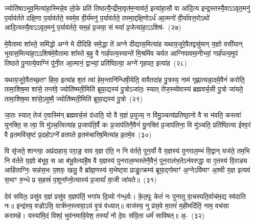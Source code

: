ज्योति॑षा\-ऽभूव॒मित्या॑हा॒स्मिन्ने॒व लो॒के प्रति॑ तिष्ठत्यै॒न्द्रीमा॒\-वृत॑म॒न्वाव॑र्त॒ इत्या॑हा॒सौ वा आ॑दि॒त्य इन्द्र॒स्तस्यै॒वा\-ऽऽ\-\-वृत॒मनु॑ प॒र्याव॑र्तते दक्षि॒णा प॒र्याव॑र्तते॒ स्वमे॒व वी॒र्य॑मनु॑ प॒र्याव॑र्तते॒ तस्मा॒द्दक्षि॒णो\-ऽर्ध॑ आ॒त्मनो॑ वी॒र्या॑वत्त॒रो\-ऽथो॑ आदि॒त्यस्यै॒वा\-ऽऽ\-वृत॒मनु॑ प॒र्याव॑र्तते॒ सम॒हं प्र॒जया॒ सं मया᳚ प्र॒जेत्या॑हा॒\-ऽऽ\-शिष॑-~(२७)

मे॒वैतामा शा᳚स्ते॒ समि॑द्धो अग्ने मे दीदिहि समे॒द्धा ते॑ अग्ने दीद्यास॒मित्या॑ह यथाय॒जुरे॒वैतद्वसु॑मान् य॒ज्ञो वसी॑यान् भूयास॒मित्या॑हा॒\-ऽऽ\-शिष॑मे॒वैतामा शा᳚स्ते ब॒हु वै गार्\mbox{}ह॑पत्य॒स्यान्ते॑ मि॒श्रमि॑व चर्यत आग्निपावमा॒नीभ्यां॒ गार्\mbox{}ह॑पत्य॒मुप॑ तिष्ठते पु॒नात्ये॒वाग्निं पु॑नी॒त आ॒त्मानं॒ द्वाभ्यां॒ प्रति॑ष्ठित्या॒ अग्ने॑ गृहपत॒ इत्या॑ह~(२८)

यथाय॒जुरे॒वैतच्छ॒तꣳ हिमा॒ इत्या॑ह श॒तं त्वा॑ हेम॒न्तानि॑न्धिषी॒येति॒ वावैतदा॑ह पु॒त्रस्य॒ नाम॑ गृह्णात्यन्ना॒दमे॒वैनं॑ करोति॒ तामा॒शिष॒मा शा॑से॒ तन्त॑वे॒ ज्योति॑ष्मती॒मिति॑ ब्रूया॒द्यस्य॑ पु॒त्रो\-ऽजा॑तः॒ स्यात् ते॑ज॒स्व्ये॑वास्य॑ ब्रह्मवर्च॒सी पु॒त्रो जा॑यते॒ तामा॒शिष॒मा शा॑से॒\-ऽमुष्मै॒ ज्योति॑ष्मती॒मिति॑ ब्रूया॒द्यस्य॑ पु॒त्रो~(२९)

जा॒तः स्यात् तेज॑ ए॒वास्मि॑न् ब्रह्मवर्च॒सं द॑धाति॒ यो वै य॒ज्ञं प्र॒युज्य॒ न वि॑मु॒ञ्चत्य॑प्रतिष्ठा॒नो वै स भ॑वति॒ कस्त्वा॑ युनक्ति॒ स त्वा॒ वि मु॑ञ्च॒त्वित्या॑ह प्र॒जा\-प॑ति॒र्वै कः प्र॒जा\-प॑तिनै॒वैनं॑ यु॒नक्ति॑ प्र॒जा\-प॑तिना॒ वि मु॑ञ्चति॒ प्रति॑ष्ठित्या ईश्व॒रं वै व्र॒तमवि॑सृष्टं प्र॒दहो\-ऽग्ने᳚ व्रतपते व्र॒तम॑चारिष॒मित्या॑ह व्र॒तमे॒व~(३०)

वि सृ॑जते॒ शान्त्या॒ अप्र॑दाहाय॒ परा॒ङ्॒ वाव य॒ज्ञ ए॑ति॒ न नि व॑र्तते॒ पुन॒र्यो वै य॒ज्ञस्य॑ पुनराल॒म्भं वि॒द्वान् यज॑ते॒ तम॒भि नि व॑र्तते य॒ज्ञो ब॑भूव॒ स आ ब॑भू॒वेत्या॑है॒ष वै य॒ज्ञस्य॑ पुनराल॒म्भस्तेनै॒वैनं॒ पुन॒राल॑भ॒ते\-ऽन॑वरुद्धा॒ वा ए॒तस्य॑ वि॒राड्य आहि॑ताग्निः॒ सन्न॑स॒भः प॒शवः॒ खलु॒ वै ब्रा᳚ह्म॒णस्य॑ स॒भेष्ट्वा प्राङु॒त्क्रम्य॑ ब्रूया॒द्गोमाꣳ॑ अ॒ग्ने\-ऽवि॑माꣳ अ॒श्वी य॒ज्ञ इत्यव॑ स॒भाꣳ रु॒न्धे प्र स॒हस्रं॑ प॒शूना᳚प्नो॒त्यास्य॑ प्र॒जायां᳚ वा॒जी जा॑यते॥~(३१)

{}%

देव॑ सवितः॒ प्रसु॑व य॒ज्ञं प्रसु॑व य॒ज्ञप॑तिं॒ भगा॑य दि॒व्यो ग॑न्ध॒र्वः। के॒त॒पूः केतं॑ नः पुनातु वा॒चस्पति॒र्वाच॑म॒द्य स्व॑दाति नः॥ इन्द्र॑स्य॒ वज्रो॑\-ऽसि॒ वार्त्र॑घ्न॒स्त्वया॒\-ऽयं वृ॒त्रं व॑ध्यात्॥ वाज॑स्य॒ नु प्र॑स॒वे मा॒तरं॑ म॒हीमदि॑तिं॒ नाम॒ वच॑सा करामहे। यस्या॑मि॒दं विश्वं॒ भुव॑नमावि॒वेश॒ तस्यां᳚ नो दे॒वः स॑वि॒ता धर्म॑ साविषत्॥ अ॒-~(३२)


